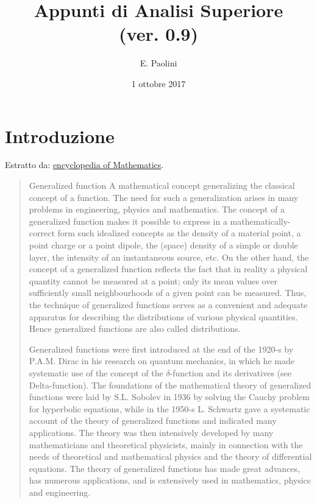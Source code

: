\documentclass[italian,a4paper,oneside,headinclude]{scrbook}
\title{Appunti di Analisi Superiore\\(ver. 0.9)}
\author{E. Paolini}
\date{1 ottobre 2017}
\begin{document}
\maketitle

\tableofcontents

\chapter{Introduzione}

Estratto da: \href{https://www.encyclopediaofmath.org/index.php/Generalized_function}{encyclopedia of Mathematics}.

\begin{quote}
Generalized function
A mathematical concept generalizing the classical concept of a
function. The need for such a generalization arises in many problems
in engineering, physics and mathematics. The concept of a generalized
function makes it possible to express in a mathematically-correct form
such idealized concepts as the density of a material point, a point
charge or a point dipole, the (space) density of a simple or double
layer, the intensity of an instantaneous source, etc. On the other
hand, the concept of a generalized function reflects the fact that in
reality a physical quantity cannot be measured at a point; only its
mean values over sufficiently small neighbourhoods of a given point
can be measured. Thus, the technique of generalized functions serves
as a convenient and adequate apparatus for describing the
distributions of various physical quantities. Hence generalized
functions are also called distributions.

Generalized functions were first introduced at the end of the 1920-s
by P.A.M. Dirac in his research on quantum mechanics, in
which he made systematic use of the concept of the $\delta$-function and its
derivatives (see Delta-function). The foundations of the mathematical
theory of generalized functions were laid by S.L. Sobolev in 1936
by solving the Cauchy problem for hyperbolic equations, while in the
1950-s L. Schwartz gave a systematic account of the theory
of generalized functions and indicated many applications. The theory
was then intensively developed by many mathematicians and theoretical
physicists, mainly in connection with the needs of theoretical and
mathematical physics and the theory of differential equations.
The theory of generalized functions has made great advances,
has numerous applications, and is extensively used in mathematics,
physics and engineering.
\end{quote}
\end{document}
